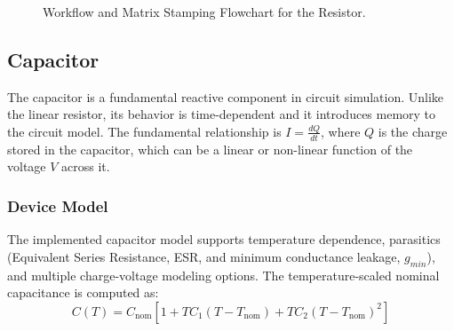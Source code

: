 \begin{figure}[H]
    \centering
    \caption{Workflow and Matrix Stamping Flowchart for the Resistor.}
    \label{fig:res_flowchart}
\end{figure}

\subsection{Capacitor}
The capacitor is a fundamental reactive component in circuit simulation. Unlike the linear resistor, its behavior is time-dependent and it introduces memory to the circuit model. The fundamental relationship is $I = \frac{dQ}{dt}$, where $Q$ is the charge stored in the capacitor, which can be a linear or non-linear function of the voltage $V$ across it.

\subsubsection{Device Model}
The implemented capacitor model supports temperature dependence, parasitics (Equivalent Series Resistance, ESR, and minimum conductance leakage, $g_{min}$), and multiple charge-voltage modeling options. The temperature-scaled nominal capacitance is computed as:
\begin{equation}
    C(T) = C_{\text{nom}} \left[ 1 + TC_1 (T - T_{\text{nom}}) + TC_2 (T - T_{\text{nom}})^2 \right]
\end{equation}

